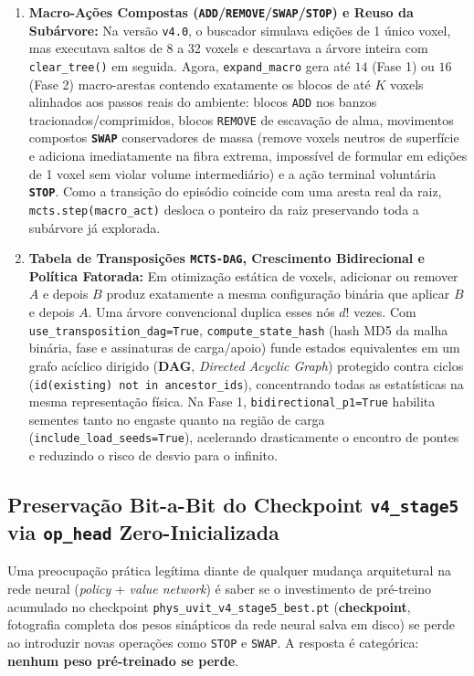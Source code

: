 \documentclass[11pt,a4paper]{article}
\begin{document}
\begin{enumerate}
  \item \textbf{Macro-Ações Compostas (\texttt{ADD}/\texttt{REMOVE}/\texttt{SWAP}/\texttt{STOP}) e Reuso da Subárvore:} Na versão \texttt{v4.0}, o buscador simulava edições de 1 único voxel, mas executava saltos de 8 a 32 voxels e descartava a árvore inteira com \texttt{clear\_tree()} em seguida. Agora, \texttt{expand\_macro} gera até $14$ (Fase 1) ou $16$ (Fase 2) macro-arestas contendo exatamente os blocos de até $K$ voxels alinhados aos passos reais do ambiente: blocos \texttt{ADD} nos banzos tracionados/comprimidos, blocos \texttt{REMOVE} de escavação de alma, movimentos compostos \textbf{\texttt{SWAP}} conservadores de massa (remove voxels neutros de superfície e adiciona imediatamente na fibra extrema, impossível de formular em edições de 1 voxel sem violar volume intermediário) e a ação terminal voluntária \textbf{\texttt{STOP}}. Como a transição do episódio coincide com uma aresta real da raiz, \texttt{mcts.step(macro\_act)} desloca o ponteiro da raiz preservando toda a subárvore já explorada.

  \item \textbf{Tabela de Transposições \texttt{MCTS-DAG}, Crescimento Bidirecional e Política Fatorada:} Em otimização estática de voxels, adicionar ou remover $A$ e depois $B$ produz exatamente a mesma configuração binária que aplicar $B$ e depois $A$. Uma árvore convencional duplica esses nós $d!$ vezes. Com \texttt{use\_transposition\_dag=True}, \texttt{compute\_state\_hash} (hash MD5 da malha binária, fase e assinaturas de carga/apoio) funde estados equivalentes em um grafo acíclico dirigido (\textbf{DAG}, \textit{Directed Acyclic Graph}) protegido contra ciclos (\texttt{id(existing) not in ancestor\_ids}), concentrando todas as estatísticas na mesma representação física. Na Fase 1, \texttt{bidirectional\_p1=True} habilita sementes tanto no engaste quanto na região de carga (\texttt{include\_load\_seeds=True}), acelerando drasticamente o encontro de pontes e reduzindo o risco de desvio para o infinito.
\end{enumerate}

\subsection{Preservação Bit-a-Bit do Checkpoint \texttt{v4\_stage5} via \texttt{op\_head} Zero-Inicializada}

Uma preocupação prática legítima diante de qualquer mudança arquitetural na rede neural (\textit{policy} + \textit{value network}) é saber se o investimento de pré-treino acumulado no checkpoint \texttt{phys\_uvit\_v4\_stage5\_best.pt} (\textbf{checkpoint}, fotografia completa dos pesos sinápticos da rede neural salva em disco) se perde ao introduzir novas operações como \texttt{STOP} e \texttt{SWAP}. A resposta é categórica: \textbf{nenhum peso pré-treinado se perde}.
\end{document}
